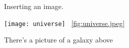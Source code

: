 \documentclass{article}
\begin{document}
	
     Inserting an image.
	
	
	\texttt{[image: universe]}
	~\ref{fig:universe.jpeg}
	
	There's a picture of a galaxy above
\end{document}
